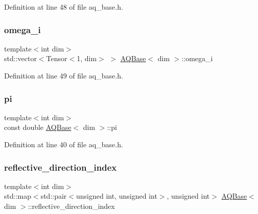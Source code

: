 Definition at line 48 of file aq\+\_\+base.\+h.

\mbox{\label{class_a_q_base_a07aaf517b03be3f8405fd4063cf59231}} 
\subsubsection{\texorpdfstring{omega\+\_\+i}{omega\_i}}
{\footnotesize\ttfamily template$<$int dim$>$ \\
std\+::vector$<$Tensor$<$1, dim$>$ $>$ \hyperlink{class_a_q_base}{A\+Q\+Base}$<$ dim $>$\+::omega\+\_\+i\hspace{0.3cm}{\ttfamily [protected]}}



Definition at line 49 of file aq\+\_\+base.\+h.

\mbox{\label{class_a_q_base_a002ce18f617db787616e60fba67899a9}} 
\subsubsection{\texorpdfstring{pi}{pi}}
{\footnotesize\ttfamily template$<$int dim$>$ \\
const double \hyperlink{class_a_q_base}{A\+Q\+Base}$<$ dim $>$\+::pi\hspace{0.3cm}{\ttfamily [protected]}}



Definition at line 40 of file aq\+\_\+base.\+h.

\mbox{\label{class_a_q_base_a9aa6c274dd0ef167528bbec76637cc22}} 
\subsubsection{\texorpdfstring{reflective\+\_\+direction\+\_\+index}{reflective\_direction\_index}}
{\footnotesize\ttfamily template$<$int dim$>$ \\
std\+::map$<$std\+::pair$<$unsigned int, unsigned int$>$, unsigned int$>$ \hyperlink{class_a_q_base}{A\+Q\+Base}$<$ dim $>$\+::reflective\+\_\+direction\+\_\+index\hspace{0.3cm}{\ttfamily [protected]}}



